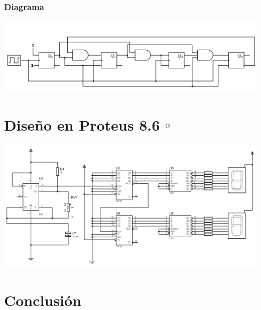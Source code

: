 \documentclass[10pt,letterpaper]{report}
\begin{document}
\subsubsection{Diagrama}
\begin{center}
\includegraphics[scale=0.3]{CircuitoLLogico}
\end{center}

\section*{Diseño en Proteus 8.6 $^\text{{\small \textcopyright}}$ }
\begin{center}
\includegraphics[scale=0.85]{Proteus-Circuito}
\end{center}
\section*{Conclusión}
    
\end{document}
